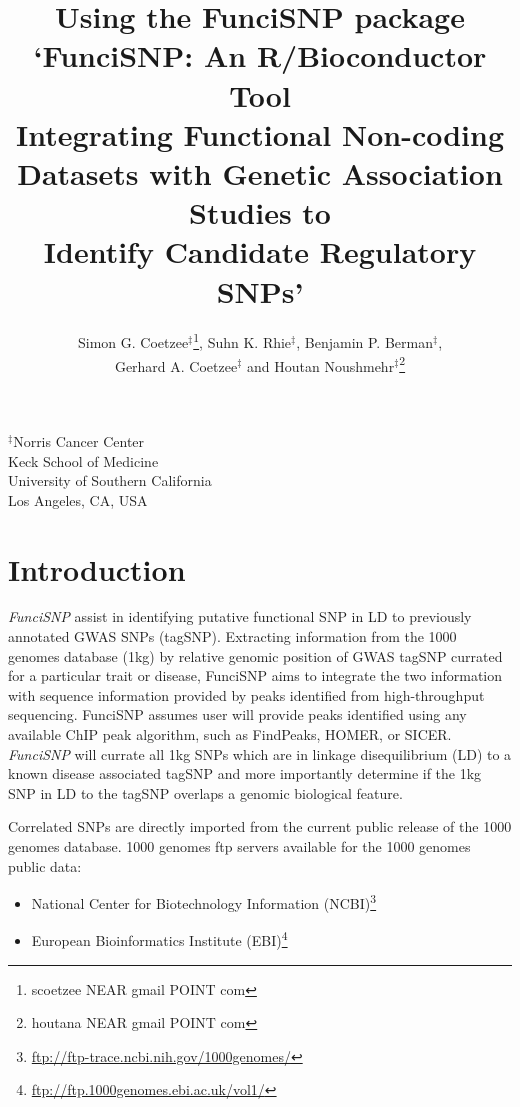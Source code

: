\documentclass[12pt,fullpage]{article}
\author{Simon G. Coetzee$^\ddagger$\footnote{scoetzee NEAR gmail POINT com},
    Suhn K. Rhie$^\ddagger$, Benjamin P. Berman$^\ddagger$,\\Gerhard A.
        Coetzee$^\ddagger$ and Houtan Noushmehr$^\ddagger$\footnote{houtana NEAR
            gmail POINT com}}
\newcommand{\Rpackage}[1]{{\textit{#1}}}
\begin{document}
\title{Using the FunciSNP package\\`FunciSNP: An R/Bioconductor Tool \\
Integrating Functional Non-coding Datasets with Genetic Association Studies to\\
 Identify Candidate Regulatory SNPs'}
\maketitle
\begin{center}
$^\ddagger$Norris Cancer Center\\Keck School of Medicine\\University of Southern
California\\Los Angeles, CA, USA
\end{center}
\tableofcontents
\section{Introduction}

\Rpackage{FunciSNP} assist in identifying putative functional SNP in LD to
previously annotated GWAS SNPs (tagSNP). Extracting information from the 1000
genomes database (1kg) by relative genomic position of GWAS tagSNP currated
for a particular trait or disease, FunciSNP aims to integrate the two
information with sequence information provided by peaks identified from
high-throughput sequencing. FunciSNP assumes user will provide peaks identified
using any available ChIP peak algorithm, such as FindPeaks, HOMER, or SICER.
\Rpackage{FunciSNP} will currate all 1kg SNPs which are in linkage
disequilibrium (LD) to a known disease associated tagSNP and more importantly
determine if the 1kg SNP in LD to the tagSNP overlaps a genomic biological
feature.

Correlated SNPs are
directly imported from the current public release of the 1000 genomes database.
1000 genomes ftp servers available for the 1000 genomes public data: 

\begin{itemize}
\item National Center for Biotechnology Information
(NCBI)\footnote{\url{ftp://ftp-trace.ncbi.nih.gov/1000genomes/}}
\item European Bioinformatics Institute
(EBI)\footnote{\url{ftp://ftp.1000genomes.ebi.ac.uk/vol1/}}
\end{itemize}
\end{document}
